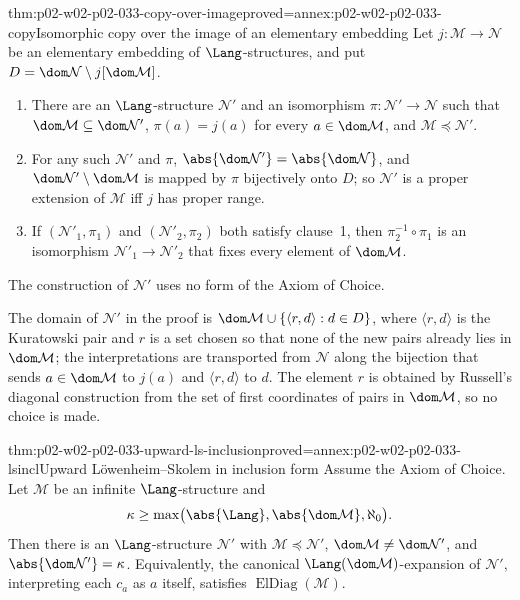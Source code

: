 \begin{hbtheorem}{thm:p02-w02-p02-033-copy-over-image}{proved=annex:p02-w02-p02-033-copy}{Isomorphic copy over the image of an elementary embedding}
Let \(j:\mathcal M\to\mathcal N\) be an elementary embedding of
\(\Lang\)-structures, and put
\(D=\dom\mathcal N\setminus j[\dom\mathcal M]\).
\begin{enumerate}
  \item There are an \(\Lang\)-structure \(\mathcal N'\) and an isomorphism
        \(\pi:\mathcal N'\to\mathcal N\) such that
        \(\dom\mathcal M\subseteq\dom\mathcal N'\),
        \(\pi(a)=j(a)\) for every \(a\in\dom\mathcal M\), and
        \(\mathcal M\preccurlyeq\mathcal N'\).
  \item For any such \(\mathcal N'\) and \(\pi\),
        \(\abs{\dom\mathcal N'}=\abs{\dom\mathcal N}\), and
        \(\dom\mathcal N'\setminus\dom\mathcal M\) is mapped by \(\pi\)
        bijectively onto \(D\); so \(\mathcal N'\) is a proper extension of
        \(\mathcal M\) iff \(j\) has proper range.
  \item If \((\mathcal N'_1,\pi_1)\) and \((\mathcal N'_2,\pi_2)\) both
        satisfy clause~1, then \(\pi_2^{-1}\circ\pi_1\) is an isomorphism
        \(\mathcal N'_1\to\mathcal N'_2\) that fixes every element of
        \(\dom\mathcal M\).
\end{enumerate}
The construction of \(\mathcal N'\) uses no form of the Axiom of Choice.
\end{hbtheorem}

The domain of \(\mathcal N'\) in the proof is
\(\dom\mathcal M\cup\{\langle r,d\rangle:d\in D\}\), where
\(\langle r,d\rangle\) is the Kuratowski pair and \(r\) is a set chosen so
that none of the new pairs already lies in \(\dom\mathcal M\); the
interpretations are transported from \(\mathcal N\) along the bijection that
sends \(a\in\dom\mathcal M\) to \(j(a)\) and \(\langle r,d\rangle\) to \(d\).
The element \(r\) is obtained by Russell's diagonal construction from the set
of first coordinates of pairs in \(\dom\mathcal M\), so no choice is made.

\begin{hbcorollary}{thm:p02-w02-p02-033-upward-ls-inclusion}{proved=annex:p02-w02-p02-033-lsincl}{Upward L\"owenheim--Skolem in inclusion form}
Assume the Axiom of Choice.  Let \(\mathcal M\) be an infinite
\(\Lang\)-structure and
\[
 \kappa\geq
 \max\bigl(\abs{\Lang},\abs{\dom\mathcal M},\aleph_0\bigr).
\]
Then there is an \(\Lang\)-structure \(\mathcal N'\) with
\(\mathcal M\preccurlyeq\mathcal N'\),
\(\dom\mathcal M\ne\dom\mathcal N'\), and
\(\abs{\dom\mathcal N'}=\kappa\).  Equivalently, the canonical
\(\Lang(\dom\mathcal M)\)-expansion of \(\mathcal N'\), interpreting each
\(c_a\) as \(a\) itself, satisfies \(\operatorname{ElDiag}(\mathcal M)\).
\end{hbcorollary}

